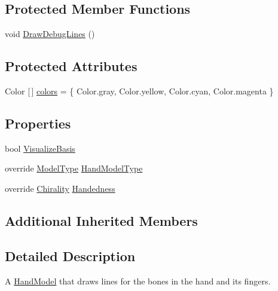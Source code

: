 \subsection*{Protected Member Functions}
\begin{DoxyCompactItemize}
\item 
void \mbox{\hyperlink{class_leap_1_1_unity_1_1_debug_hand_a013b3eb2cdabba0ddcc7e38aa3ee3044}{Draw\+Debug\+Lines}} ()
\end{DoxyCompactItemize}
\subsection*{Protected Attributes}
\begin{DoxyCompactItemize}
\item 
Color \mbox{[}$\,$\mbox{]} \mbox{\hyperlink{class_leap_1_1_unity_1_1_debug_hand_abe57d750cd5877dc24cc93f593fb0d3b}{colors}} = \{ Color.\+gray, Color.\+yellow, Color.\+cyan, Color.\+magenta \}
\end{DoxyCompactItemize}
\subsection*{Properties}
\begin{DoxyCompactItemize}
\item 
bool \mbox{\hyperlink{class_leap_1_1_unity_1_1_debug_hand_ae5f9ba1586c260729c18963e5ce2bd92}{Visualize\+Basis}}
\item 
override \mbox{\hyperlink{namespace_leap_1_1_unity_a186e5eb0a2b743f1f6b79346f0ab8ad0}{Model\+Type}} \mbox{\hyperlink{class_leap_1_1_unity_1_1_debug_hand_aa83762c9f8d2288619683ea6c423dda3}{Hand\+Model\+Type}}
\item 
override \mbox{\hyperlink{namespace_leap_1_1_unity_a4d15adcf20ba121b2cd9c07f503b606f}{Chirality}} \mbox{\hyperlink{class_leap_1_1_unity_1_1_debug_hand_a28c11b6ea4043f473e856168d5af15fa}{Handedness}}
\end{DoxyCompactItemize}
\subsection*{Additional Inherited Members}


\subsection{Detailed Description}
A \mbox{\hyperlink{class_leap_1_1_unity_1_1_hand_model}{Hand\+Model}} that draws lines for the bones in the hand and its fingers.

